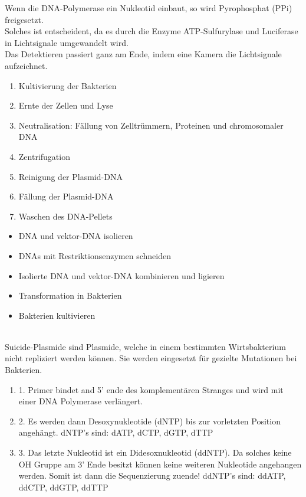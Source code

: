 Wenn die DNA-Polymerase ein Nukleotid einbaut, so wird Pyrophosphat (PPi) freigesetzt.\\
Solches ist entscheident, da es durch die Enzyme ATP-Sulfurylase und Luciferase in Lichtsignale umgewandelt wird. \\
Das Detektieren passiert ganz am Ende, indem eine Kamera die Lichtsignale aufzeichnet. \\ \newline


\begin{enumerate}
    \item Kultivierung der Bakterien
    \item Ernte der Zellen und Lyse
    \item Neutralisation: Fällung von Zelltrümmern, Proteinen und chromosomaler DNA
    \item Zentrifugation
    \item Reinigung der Plasmid-DNA
    \item Fällung der Plasmid-DNA
    \item Waschen des DNA-Pellets
\end{enumerate}

\begin{itemize}
    \item DNA und \gls{vektor}-DNA isolieren 
    \item DNAs mit Restriktionsenzymen schneiden
    \item Isolierte DNA und \gls{vektor}-DNA kombinieren und ligieren
    \item Transformation in Bakterien 
    \item Bakterien kultivieren
\end{itemize}  $\ $ \\

Suicide-Plasmide sind Plasmide, welche in einem bestimmten Wirtsbakterium nicht repliziert werden können.
Sie werden eingesetzt für gezielte Mutationen bei Bakterien.   
\\ \newline

\begin{enumerate}
    \item 1. Primer bindet and 5’ ende des komplementären Stranges und wird mit
einer DNA Polymerase verlängert.
\item 2. Es werden dann Desoxynukleotide (dNTP) bis zur vorletzten Position
angehängt.
dNTP’s sind: dATP, dCTP, dGTP, dTTP
\item 3. Das letzte Nukleotid ist ein Didesoxnukleotid (ddNTP). Da solches keine OH Gruppe am 3’ Ende besitzt können keine weiteren Nukleotide angehangen werden. Somit ist dann die Sequenzierung zuende! ddNTP’s sind: ddATP, ddCTP, ddGTP, ddTTP
\end{enumerate} $\ $ \\

